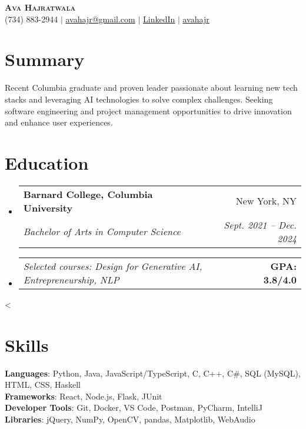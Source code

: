 \documentclass[letterpaper,11pt]{article}
\makeatletter
\newcommand{\resumeSubheading}[4]{
    \vspace{-2pt}\item
    \begin{tabular*}{0.97\textwidth}[t]{l@{\extracolsep{\fill}}r}
    \textbf{#1} & #2 \\
    \textit{\small#3} & \textit{\small #4} \\
    \end{tabular*}\vspace{-7pt}
}
\newcommand{\relevantCourseWorkAndGPA}[2]{
    \item
    \begin{tabular*}{0.97\textwidth}{l@{\extracolsep{\fill}}r}
    \textit{Selected courses: \small#1} & \textbf{\small GPA: #2/4.0} \\
    \end{tabular*}\vspace{-7pt}
}
\newcommand{\conditionalVspace}[1]{%
\ifnum\value{enumi}<\value{enumii}%
\vspace{#1}%
\fi
}
\newcommand{\resumeSubHeadingListStart}{\begin{itemize}[leftmargin=0.15in, label={}] \setlength{\itemsep}{7pt}}
\newcommand{\resumeSubHeadingListEnd}{\end{itemize}\conditionalVspace{7pt}}
\makeatother
\begin{document}

\begin{center}
\textbf{\Huge \scshape Ava Hajratwala} \\ \vspace{1pt}
\small (734) 883-2944 $|$ \href{mailto:avahajr@gmail.com}{{avahajr@gmail.com}} $|$
\href{https://linkedin.com/in/avahajr}{\color{blue} \underline{LinkedIn}} $|$
{\faGithub} \href{https://github.com/avahajr}{\color{blue}\underline{avahajr}}
\end{center}

\section{Summary}
\small Recent Columbia graduate and proven leader passionate about learning new tech stacks and leveraging AI technologies to solve complex challenges. Seeking software engineering and project management opportunities to drive innovation and enhance user experiences.
\section{Education}
\resumeSubHeadingListStart
\resumeSubheading
{Barnard College, Columbia University}{New York, NY}
{Bachelor of Arts in Computer Science}{Sept. 2021 -- Dec. 2024}
\relevantCourseWorkAndGPA{Design for Generative AI, Entrepreneurship, NLP}{3.8}
\resumeSubHeadingListEnd

\section{Skills}
\begin{itemize}[leftmargin=0.15in, label={}]
\small{\item{
\textbf{Languages}{: Python, Java, JavaScript/TypeScript, C, C++, C\#, SQL (MySQL), HTML, CSS, Haskell} \\
\textbf{Frameworks}{: React, Node.js, Flask, JUnit } \\
\textbf{Developer Tools}{: Git, Docker, VS Code, Postman, PyCharm, IntelliJ} \\
\textbf{Libraries}{: jQuery, NumPy, OpenCV, pandas, Matplotlib, WebAudio}
}}
\end{itemize}
\end{document}
